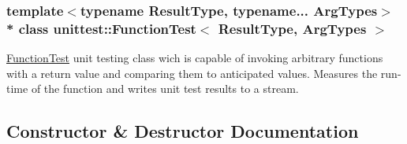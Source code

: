\subsubsection*{template$<$typename Result\+Type, typename... Arg\+Types$>$\\*
class unittest\+::\+Function\+Test$<$ Result\+Type, Arg\+Types $>$}

\hyperlink{classunittest_1_1_function_test}{Function\+Test} unit testing class wich is capable of invoking arbitrary functions with a return value and comparing them to anticipated values. Measures the run-\/time of the function and writes unit test results to a stream. 

\subsection{Constructor \& Destructor Documentation}

